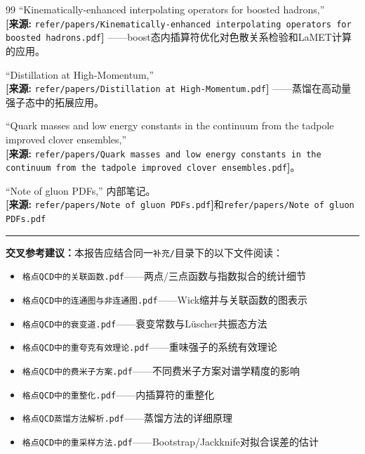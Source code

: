 \documentclass[12pt,a4paper]{ctexart}
\theoremstyle{definition}
\begin{document}
\begin{thebibliography}{99}
``Kinematically-enhanced interpolating operators for boosted hadrons,''
\\\textbf{[来源:} \texttt{refer/papers/Kinematically-enhanced interpolating operators for boosted hadrons.pdf}\textbf{]}
——boost态内插算符优化对色散关系检验和LaMET计算的应用。

``Distillation at High-Momentum,''
\\\textbf{[来源:} \texttt{refer/papers/Distillation at High-Momentum.pdf}\textbf{]}
——蒸馏在高动量强子态中的拓展应用。

``Quark masses and low energy constants in the continuum from the tadpole improved clover ensembles,''
\\\textbf{[来源:} \texttt{refer/papers/Quark masses and low energy constants in the continuum from the tadpole improved clover ensembles.pdf}\textbf{]}。

``Note of gluon PDFs,'' 内部笔记。
\\\textbf{[来源:} \texttt{refer/papers/Note of gluon PDFs.pdf}\textbf{]}和\texttt{refer/papers/Note of gluon PDFs.pdf}

\end{thebibliography}

\vspace{0.5cm}
\noindent\rule{\textwidth}{0.5pt}
\small
\textbf{交叉参考建议：}本报告应结合同一\texttt{补充/}目录下的以下文件阅读：
\begin{itemize}[nosep]
    \item \texttt{格点QCD中的关联函数.pdf}——两点/三点函数与指数拟合的统计细节
    \item \texttt{格点QCD中的连通图与非连通图.pdf}——Wick缩并与关联函数的图表示
    \item \texttt{格点QCD中的衰变道.pdf}——衰变常数与L\"uscher共振态方法
    \item \texttt{格点QCD中的重夸克有效理论.pdf}——重味强子的系统有效理论
    \item \texttt{格点QCD中的费米子方案.pdf}——不同费米子方案对谱学精度的影响
    \item \texttt{格点QCD中的重整化.pdf}——内插算符的重整化
    \item \texttt{格点QCD蒸馏方法解析.pdf}——蒸馏方法的详细原理
    \item \texttt{格点QCD中的重采样方法.pdf}——Bootstrap/Jackknife对拟合误差的估计
\end{itemize}
\end{document}
